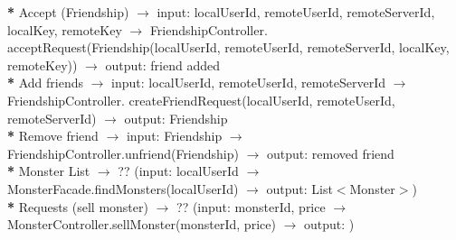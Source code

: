 \textbf{*} Accept (Friendship) \begin{math}\to\end{math} input: localUserId, remoteUserId, remoteServerId, localKey, remoteKey \begin{math}\to\end{math} FriendshipController. acceptRequest(Friendship(localUserId, remoteUserId, remoteServerId, localKey, remoteKey)) \begin{math}\to\end{math} output: friend added\\

\textbf{*} Add friends \begin{math}\to\end{math} input: localUserId, remoteUserId, remoteServerId \begin{math}\to\end{math} FriendshipController. createFriendRequest(localUserId, remoteUserId, remoteServerId) \begin{math}\to\end{math} output: Friendship\\

\textbf{*} Remove friend \begin{math}\to\end{math} input: Friendship \begin{math}\to\end{math}  FriendshipController.unfriend(Friendship) \begin{math}\to\end{math} output: removed friend \\

\textbf{*} Monster List \begin{math}\to\end{math} ?? (input: localUserId \begin{math}\to\end{math} MonsterFacade.findMonsters(localUserId) \begin{math}\to\end{math} output: List\begin{math}<\end{math}Monster\begin{math}>\end{math})\\

\textbf{*} Requests (sell monster) \begin{math}\to\end{math} ?? (input: monsterId, price \begin{math}\to\end{math} MonsterController.sellMonster(monsterId, price) \begin{math}\to\end{math} output: )\\

